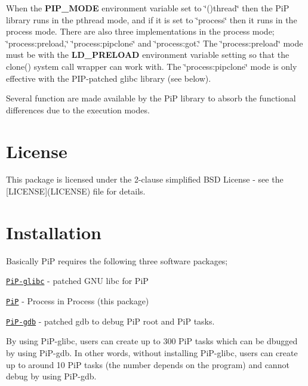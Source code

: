 When the {\bfseries P\-I\-P\-\_\-\-M\-O\-D\-E} environment variable set to \char`\"{}()thread\char`\"{} then the Pi\-P library runs in the pthread mode, and if it is set to \char`\"{}process\char`\"{} then it runs in the process mode. There are also three implementations in the process mode; \char`\"{}process\-:preload,\char`\"{} \char`\"{}process\-:pipclone\char`\"{} and \char`\"{}process\-:got.\char`\"{} The \char`\"{}process\-:preload\char`\"{} mode must be with the {\bfseries L\-D\-\_\-\-P\-R\-E\-L\-O\-A\-D} environment variable setting so that the clone() system call wrapper can work with. The \char`\"{}process\-:pipclone\char`\"{} mode is only effective with the P\-I\-P-\/patched glibc library (see below).

Several function are made available by the Pi\-P library to absorb the functional differences due to the execution modes.

\section*{License}

This package is licensed under the 2-\/clause simplified B\-S\-D License -\/ see the \mbox{[}L\-I\-C\-E\-N\-S\-E\mbox{]}(L\-I\-C\-E\-N\-S\-E) file for details.

\section*{Installation}

Basically Pi\-P requires the following three software packages;


\begin{DoxyItemize}
\item \href{https://github.com/RIKEN-SysSoft/PiP-glibc}{\tt Pi\-P-\/glibc} -\/ patched G\-N\-U libc for Pi\-P
\item \href{https://github.com/RIKEN-SysSoft/PiP}{\tt Pi\-P} -\/ Process in Process (this package)
\item \href{https://github.com/RIKEN-SysSoft/PiP-gdb}{\tt Pi\-P-\/gdb} -\/ patched gdb to debug Pi\-P root and Pi\-P tasks.
\end{DoxyItemize}

By using Pi\-P-\/glibc, users can create up to 300 Pi\-P tasks which can be dbugged by using Pi\-P-\/gdb. In other words, without installing Pi\-P-\/glibc, users can create up to around 10 Pi\-P tasks (the number depends on the program) and cannot debug by using Pi\-P-\/gdb.

